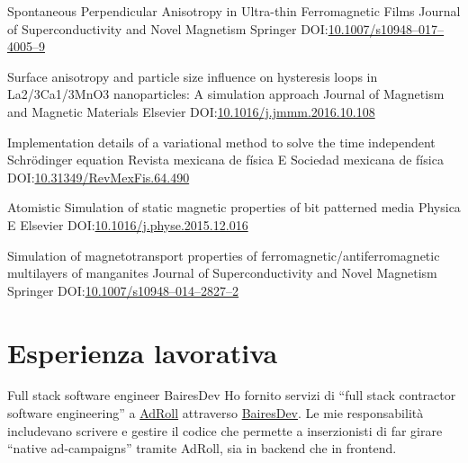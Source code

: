\documentclass[12pt,english]{moderncv}
\begin{document}
        {%
            Spontaneous Perpendicular Anisotropy in Ultra-thin Ferromagnetic
            Films%
        }
        {Journal of Superconductivity and Novel Magnetism}
        {Springer}
        {}
        {DOI:\@ \href{https://doi.org/10.1007/s10948-017-4005-9}{10.1007/s10948--017--4005--9}}

        {%
            Surface anisotropy and particle size influence on hysteresis loops
            in La2/3Ca1/3MnO3 nanoparticles: A simulation approach%
        }
        {Journal of Magnetism and Magnetic Materials}
        {Elsevier}
        {}
        {DOI:\@ \href{https://doi.org/10.1016/j.jmmm.2016.10.108}{10.1016/j.jmmm.2016.10.108}}

        {%
            Implementation details of a variational method to solve the time
            independent Schrödinger equation%
        }
        {Revista mexicana de física E}
        {Sociedad mexicana de física}
        {}
        {DOI:\@ \href{https://doi.org/10.31349/RevMexFis.64.490}{10.31349/RevMexFis.64.490}}

        {Atomistic Simulation of static magnetic properties of bit patterned media}
        {Physica E}
        {Elsevier}
        {}
        {DOI:\@ \href{https://doi.org/10.1016/j.physe.2015.12.016}{10.1016/j.physe.2015.12.016}}

        {%
            Simulation of magnetotransport properties of
            ferromagnetic/antiferromagnetic multilayers of manganites%
        }
        {Journal of Superconductivity and Novel Magnetism}
        {Springer}
        {}
        {DOI:\@ \href{https://doi.org/10.1007/s10948-014-2827-2}{10.1007/s10948--014--2827--2}}


\section{Esperienza lavorativa}

        {Full stack software engineer}
        {BairesDev}
        {}
        {}
        {%
            Ho fornito servizi di ``full stack contractor software engineering'' a
            \href{https://www.adroll.com/}{AdRoll} attraverso
            \href{http://www.bairesdev.com/}{BairesDev}.
            Le mie responsabilit\`a includevano scrivere e gestire il codice che permette a inserzionisti di far girare ``native ad-campaigns'' tramite AdRoll, sia in backend che in frontend.
        }
\end{document}
